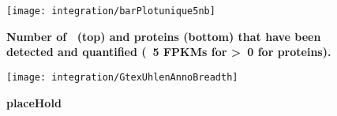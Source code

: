 \begin{figure}%
    \texttt{[image: integration/barPlotunique5nb]}\centering
    \caption[Number of \mRNAs\ (\geq\ 5 \glspl{FPKM}) and proteins detected
    (at specific thresholds) only in one unique
    tissue]{\label{fig:barPlotunique5nb}\textbf{Number of \mRNAs\ (top)
    and proteins (bottom) that have been detected and quantified
    (\geq\ 5 \glspl{FPKM} for \mRNA\; \textgreater\ 0 for proteins).}}
\end{figure}


\begin{figure}[!htbp]
\texttt{[image: integration/GtexUhlenAnnoBreadth]}
\caption[placeHold]{\label{fig:breadthColGtexUhlen}\textbf{placeHold}}
\end{figure}




\clearpage
\thispagestyle{plain}
\small


